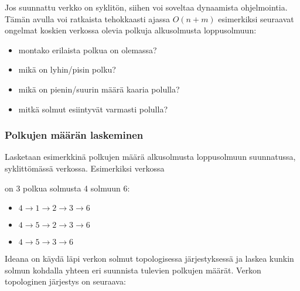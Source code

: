 Jos suunnattu verkko on syklitön,
siihen voi soveltaa dynaamista ohjelmointia.
Tämän avulla voi ratkaista tehokkaasti
ajassa $O(n+m)$ esimerkiksi seuraavat
ongelmat koskien verkossa olevia polkuja
alkusolmusta loppusolmuun:
\begin{itemize}
\item montako erilaista polkua on olemassa?
\item mikä on lyhin/pisin polku?
\item mikä on pienin/suurin määrä kaaria polulla?
\item mitkä solmut esiintyvät varmasti polulla?
\end{itemize}

\subsubsection{Polkujen määrän laskeminen}

Lasketaan esimerkkinä polkujen määrä
alkusolmusta loppusolmuun suunnatussa,
syklittömässä verkossa.
Esimerkiksi verkossa
\begin{center}
\end{center}
on 3 polkua solmusta 4 solmuun 6:
\begin{itemize}
\item $4 \rightarrow 1 \rightarrow 2 \rightarrow 3 \rightarrow 6$
\item $4 \rightarrow 5 \rightarrow 2 \rightarrow 3 \rightarrow 6$
\item $4 \rightarrow 5 \rightarrow 3 \rightarrow 6$
\end{itemize}
Ideana on käydä läpi verkon solmut topologisessa järjestyksessä
ja laskea kunkin solmun kohdalla yhteen eri suunnista
tulevien polkujen määrät.
Verkon topologinen järjestys on seuraava:

